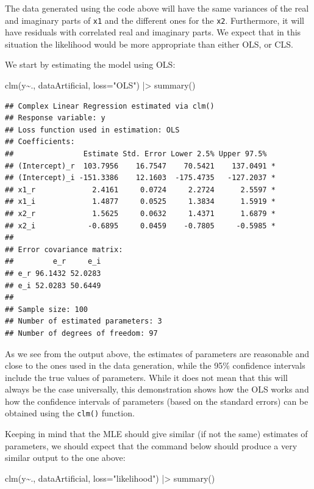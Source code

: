 \documentclass[
]{book}
\newenvironment{Shaded}{\begin{snugshade}}{\end{snugshade}}
\newcommand{\AttributeTok}[1]{\textcolor[rgb]{0.77,0.63,0.00}{#1}}
\newcommand{\FunctionTok}[1]{\textcolor[rgb]{0.00,0.00,0.00}{#1}}
\newcommand{\NormalTok}[1]{#1}
\newcommand{\SpecialCharTok}[1]{\textcolor[rgb]{0.00,0.00,0.00}{#1}}
\newcommand{\StringTok}[1]{\textcolor[rgb]{0.31,0.60,0.02}{#1}}
\begin{document}
The data generated using the code above will have the same variances of the real and imaginary parts of \texttt{x1} and the different ones for the \texttt{x2}. Furthermore, it will have residuals with correlated real and imaginary parts. We expect that in this situation the likelihood would be more appropriate than either OLS, or CLS.

We start by estimating the model using OLS:

\begin{Shaded}
\begin{Highlighting}[]
\FunctionTok{clm}\NormalTok{(y}\SpecialCharTok{\textasciitilde{}}\NormalTok{., dataArtificial, }\AttributeTok{loss=}\StringTok{"OLS"}\NormalTok{) }\SpecialCharTok{|\textgreater{}}
    \FunctionTok{summary}\NormalTok{()}
\end{Highlighting}
\end{Shaded}

\begin{verbatim}
## Complex Linear Regression estimated via clm()
## Response variable: y
## Loss function used in estimation: OLS
## Coefficients:
##                Estimate Std. Error Lower 2.5% Upper 97.5%  
## (Intercept)_r  103.7956    16.7547    70.5421    137.0491 *
## (Intercept)_i -151.3386    12.1603  -175.4735   -127.2037 *
## x1_r             2.4161     0.0724     2.2724      2.5597 *
## x1_i             1.4877     0.0525     1.3834      1.5919 *
## x2_r             1.5625     0.0632     1.4371      1.6879 *
## x2_i            -0.6895     0.0459    -0.7805     -0.5985 *
## 
## Error covariance matrix:
##         e_r     e_i
## e_r 96.1432 52.0283
## e_i 52.0283 50.6449
## 
## Sample size: 100
## Number of estimated parameters: 3
## Number of degrees of freedom: 97
\end{verbatim}

As we see from the output above, the estimates of parameters are reasonable and close to the ones used in the data generation, while the 95\% confidence intervals include the true values of parameters. While it does not mean that this will always be the case universally, this demonstration shows how the OLS works and how the confidence intervals of parameters (based on the standard errors) can be obtained using the \texttt{clm()} function.

Keeping in mind that the MLE should give similar (if not the same) estimates of parameters, we should expect that the command below should produce a very similar output to the one above:

\begin{Shaded}
\begin{Highlighting}[]
\FunctionTok{clm}\NormalTok{(y}\SpecialCharTok{\textasciitilde{}}\NormalTok{., dataArtificial, }\AttributeTok{loss=}\StringTok{"likelihood"}\NormalTok{) }\SpecialCharTok{|\textgreater{}}
    \FunctionTok{summary}\NormalTok{()}
\end{Highlighting}
\end{Shaded}
\end{document}
